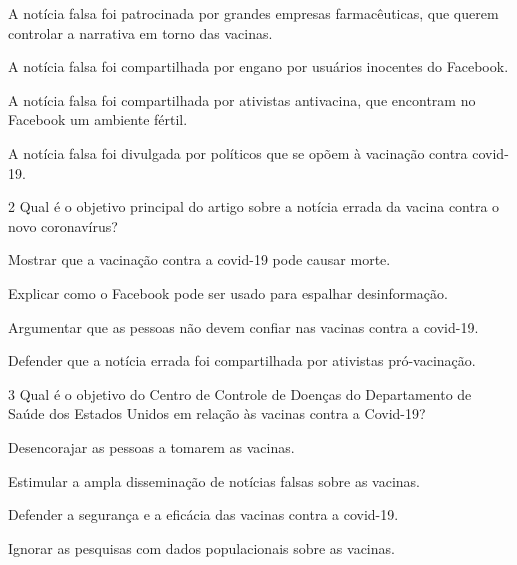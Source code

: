 \begin{escolha}
\item A notícia falsa foi patrocinada por grandes empresas farmacêuticas,
que querem controlar a narrativa em torno das vacinas.

\item A notícia falsa foi compartilhada por engano por usuários inocentes
do Facebook.

\item A notícia falsa foi compartilhada por ativistas antivacina, que
encontram no Facebook um ambiente fértil.

\item A notícia falsa foi divulgada por políticos que se opõem à vacinação contra covid-19.
\end{escolha}



\num{2} Qual é o objetivo principal do artigo sobre a notícia errada da vacina
contra o novo coronavírus?

\begin{escolha}
\item Mostrar que a vacinação contra a covid-19 pode causar morte.

\item Explicar como o Facebook pode ser usado para espalhar desinformação.

\item Argumentar que as pessoas não devem confiar nas vacinas contra a covid-19.

\item Defender que a notícia errada foi compartilhada por ativistas pró-vacinação.
\end{escolha}



\num{3} Qual é o objetivo do Centro de Controle de Doenças do Departamento de Saúde dos Estados
Unidos em relação às vacinas contra a Covid-19?

\begin{escolha}
\item Desencorajar as pessoas a tomarem as vacinas.

\item Estimular a ampla disseminação de notícias falsas sobre as vacinas.

\item Defender a segurança e a eficácia das vacinas contra a covid-19.

\item Ignorar as pesquisas com dados populacionais sobre as vacinas.
\end{escolha}



